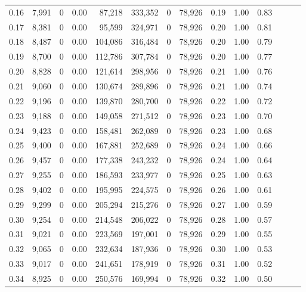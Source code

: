 \begin{tabular}{rrrrrrrrrrrrrr}
0.16 &  7,991 &      0 &  0.00 &   87,218 &  333,352 &       0 &  78,926 &  0.19 &  1.00 &      0.83 \\
0.17 &  8,381 &      0 &  0.00 &   95,599 &  324,971 &       0 &  78,926 &  0.20 &  1.00 &      0.81 \\
0.18 &  8,487 &      0 &  0.00 &  104,086 &  316,484 &       0 &  78,926 &  0.20 &  1.00 &      0.79 \\
0.19 &  8,700 &      0 &  0.00 &  112,786 &  307,784 &       0 &  78,926 &  0.20 &  1.00 &      0.77 \\
0.20 &  8,828 &      0 &  0.00 &  121,614 &  298,956 &       0 &  78,926 &  0.21 &  1.00 &      0.76 \\
0.21 &  9,060 &      0 &  0.00 &  130,674 &  289,896 &       0 &  78,926 &  0.21 &  1.00 &      0.74 \\
0.22 &  9,196 &      0 &  0.00 &  139,870 &  280,700 &       0 &  78,926 &  0.22 &  1.00 &      0.72 \\
0.23 &  9,188 &      0 &  0.00 &  149,058 &  271,512 &       0 &  78,926 &  0.23 &  1.00 &      0.70 \\
0.24 &  9,423 &      0 &  0.00 &  158,481 &  262,089 &       0 &  78,926 &  0.23 &  1.00 &      0.68 \\
0.25 &  9,400 &      0 &  0.00 &  167,881 &  252,689 &       0 &  78,926 &  0.24 &  1.00 &      0.66 \\
0.26 &  9,457 &      0 &  0.00 &  177,338 &  243,232 &       0 &  78,926 &  0.24 &  1.00 &      0.64 \\
0.27 &  9,255 &      0 &  0.00 &  186,593 &  233,977 &       0 &  78,926 &  0.25 &  1.00 &      0.63 \\
0.28 &  9,402 &      0 &  0.00 &  195,995 &  224,575 &       0 &  78,926 &  0.26 &  1.00 &      0.61 \\
0.29 &  9,299 &      0 &  0.00 &  205,294 &  215,276 &       0 &  78,926 &  0.27 &  1.00 &      0.59 \\
0.30 &  9,254 &      0 &  0.00 &  214,548 &  206,022 &       0 &  78,926 &  0.28 &  1.00 &      0.57 \\
0.31 &  9,021 &      0 &  0.00 &  223,569 &  197,001 &       0 &  78,926 &  0.29 &  1.00 &      0.55 \\
0.32 &  9,065 &      0 &  0.00 &  232,634 &  187,936 &       0 &  78,926 &  0.30 &  1.00 &      0.53 \\
0.33 &  9,017 &      0 &  0.00 &  241,651 &  178,919 &       0 &  78,926 &  0.31 &  1.00 &      0.52 \\
0.34 &  8,925 &      0 &  0.00 &  250,576 &  169,994 &       0 &  78,926 &  0.32 &  1.00 &      0.50 \\

\end{tabular}
